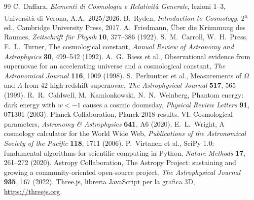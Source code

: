 \documentclass[11pt,a4paper]{article}
\begin{document}
\begin{thebibliography}{99}\small
{} C.~Daffara, \emph{Elementi di Cosmologia e Relatività Generale}, lezioni 1--3, Università di Verona, A.A.\ 2025/2026.
 B.~Ryden, \emph{Introduction to Cosmology}, 2\textsuperscript{a} ed., Cambridge University Press, 2017.
 A.~Friedmann, Über die Krümmung des Raumes, \emph{Zeitschrift für Physik} \textbf{10}, 377--386 (1922).
 S.~M.~Carroll, W.~H.~Press, E.~L.~Turner, The cosmological constant, \emph{Annual Review of Astronomy and Astrophysics} \textbf{30}, 499--542 (1992).
 A.~G.~Riess et al., Observational evidence from supernovae for an accelerating universe and a cosmological constant, \emph{The Astronomical Journal} \textbf{116}, 1009 (1998).
 S.~Perlmutter et al., Measurements of $\Omega$ and $\Lambda$ from 42 high-redshift supernovae, \emph{The Astrophysical Journal} \textbf{517}, 565 (1999).
 R.~R.~Caldwell, M.~Kamionkowski, N.~N.~Weinberg, Phantom energy: dark energy with $w<-1$ causes a cosmic doomsday, \emph{Physical Review Letters} \textbf{91}, 071301 (2003).
 Planck Collaboration, Planck 2018 results. VI. Cosmological parameters, \emph{Astronomy \& Astrophysics} \textbf{641}, A6 (2020).
 E.~L.~Wright, A cosmology calculator for the World Wide Web, \emph{Publications of the Astronomical Society of the Pacific} \textbf{118}, 1711 (2006).
 P.~Virtanen et al., SciPy 1.0: fundamental algorithms for scientific computing in Python, \emph{Nature Methods} \textbf{17}, 261--272 (2020).
 Astropy Collaboration, The Astropy Project: sustaining and growing a community-oriented open-source project, \emph{The Astrophysical Journal} \textbf{935}, 167 (2022).
 Three.js, libreria JavaScript per la grafica 3D, \url{https://threejs.org}.
\end{thebibliography}
\end{document}
